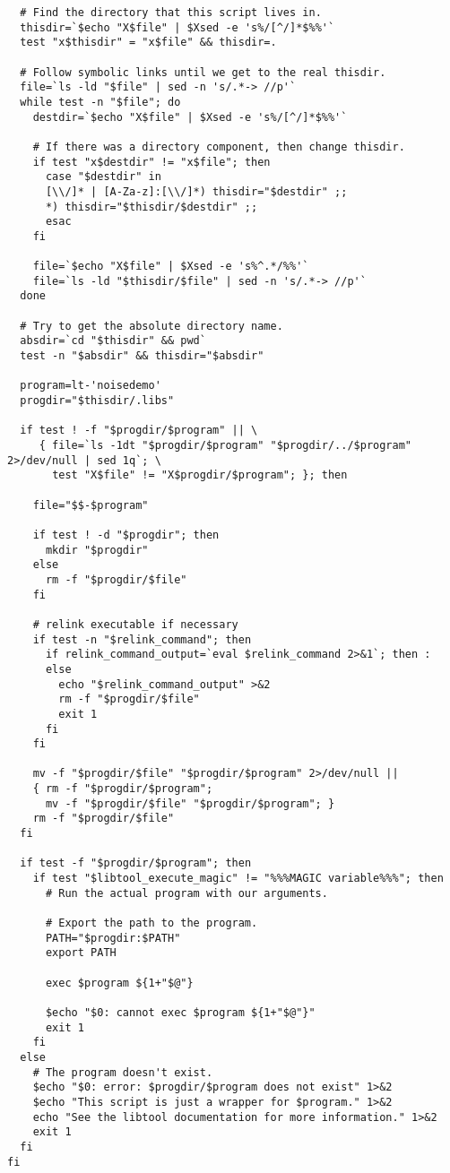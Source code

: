\begin{verbatim}
  # Find the directory that this script lives in.
  thisdir=`$echo "X$file" | $Xsed -e 's%/[^/]*$%%'`
  test "x$thisdir" = "x$file" && thisdir=.

  # Follow symbolic links until we get to the real thisdir.
  file=`ls -ld "$file" | sed -n 's/.*-> //p'`
  while test -n "$file"; do
    destdir=`$echo "X$file" | $Xsed -e 's%/[^/]*$%%'`

    # If there was a directory component, then change thisdir.
    if test "x$destdir" != "x$file"; then
      case "$destdir" in
      [\\/]* | [A-Za-z]:[\\/]*) thisdir="$destdir" ;;
      *) thisdir="$thisdir/$destdir" ;;
      esac
    fi

    file=`$echo "X$file" | $Xsed -e 's%^.*/%%'`
    file=`ls -ld "$thisdir/$file" | sed -n 's/.*-> //p'`
  done

  # Try to get the absolute directory name.
  absdir=`cd "$thisdir" && pwd`
  test -n "$absdir" && thisdir="$absdir"

  program=lt-'noisedemo'
  progdir="$thisdir/.libs"

  if test ! -f "$progdir/$program" || \
     { file=`ls -1dt "$progdir/$program" "$progdir/../$program" 2>/dev/null | sed 1q`; \
       test "X$file" != "X$progdir/$program"; }; then

    file="$$-$program"

    if test ! -d "$progdir"; then
      mkdir "$progdir"
    else
      rm -f "$progdir/$file"
    fi

    # relink executable if necessary
    if test -n "$relink_command"; then
      if relink_command_output=`eval $relink_command 2>&1`; then :
      else
        echo "$relink_command_output" >&2
        rm -f "$progdir/$file"
        exit 1
      fi
    fi

    mv -f "$progdir/$file" "$progdir/$program" 2>/dev/null ||
    { rm -f "$progdir/$program";
      mv -f "$progdir/$file" "$progdir/$program"; }
    rm -f "$progdir/$file"
  fi

  if test -f "$progdir/$program"; then
    if test "$libtool_execute_magic" != "%%%MAGIC variable%%%"; then
      # Run the actual program with our arguments.

      # Export the path to the program.
      PATH="$progdir:$PATH"
      export PATH

      exec $program ${1+"$@"}

      $echo "$0: cannot exec $program ${1+"$@"}"
      exit 1
    fi
  else
    # The program doesn't exist.
    $echo "$0: error: $progdir/$program does not exist" 1>&2
    $echo "This script is just a wrapper for $program." 1>&2
    echo "See the libtool documentation for more information." 1>&2
    exit 1
  fi
fi
\end{verbatim}\normalsize
 